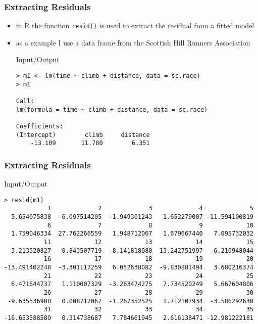 \begin{frame}[fragile]\frametitle{Extracting Residuals}
  \begin{itemize}
  \item in R the function \texttt{resid()} is used to extract the residual from a fitted model
  \item as a example I use a data frame from the Scottish Hill Runners Association
    \begin{exampleblock}{Input/Output}\footnotesize
\begin{verbatim}
> m1 <- lm(time ~ climb + distance, data = sc.race)
> m1

Call:
lm(formula = time ~ climb + distance, data = sc.race)

Coefficients:
(Intercept)        climb     distance  
    -13.109       11.780        6.351  
\end{verbatim}
    \end{exampleblock}

  \end{itemize}
\end{frame}


\begin{frame}[fragile]\frametitle{Extracting Residuals}
  \begin{exampleblock}{Input/Output}\scriptsize
\begin{verbatim}
> resid(m1)
            1             2             3             4             5 
  5.654075838  -6.097514205  -1.949301243   1.652279007 -11.594100819 
            6             7             8             9            10 
  1.759046334  27.762266559   1.948712067   1.679667440   7.095732032 
           11            12            13            14            15 
  3.213520827   0.843507719  -8.141818080  13.242751997  -6.210948044 
           16            17            18            19            20 
-13.491402248  -3.301117259   6.052638082  -9.830881494   3.680216374
           21            22            23            24            25 
  6.471644737   1.110007329  -3.263474275   7.734520249   5.667604806 
           26            27            28            29            30 
 -9.635536908   0.008712067  -1.267352525   1.712107934  -3.586292630 
           31            32            33            34            35 
-16.653588589   0.314738687   7.784661945   2.616138471 -12.981222181 
\end{verbatim}
  \end{exampleblock}
\end{frame}

